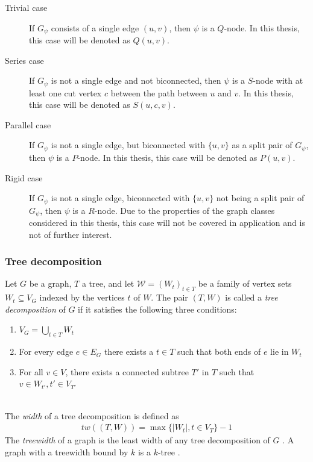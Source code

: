 \begin{description}
	\item[Trivial case] If $G_\psi$ consists of a single edge $(u,v)$, then $\psi$ is a $Q$-node. In this thesis, this case will be denoted as $Q(u,v)$.
	\item[Series case] If $G_\psi$ is not a single edge and not biconnected, then $\psi$ is a $S$-node with at least one cut vertex $c$ between the path between $u$ and $v$. In this thesis, this case will be denoted as $S(u,c,v)$.
	\item[Parallel case] If $G_\psi$ is not a single edge, but biconnected with $\{u,v\}$ as a split pair of $G_\psi$, then $\psi$ is a $P$-node. In this thesis, this case will be denoted as $P(u,v)$.
	\item[Rigid case] If $G_\psi$ is not a single edge, biconnected with $\{u,v\}$ not being a split pair of $G_\psi$, then $\psi$ is a $R$-node. Due to the properties of the graph classes considered in this thesis, this case will not be covered in application and is not of further interest. 
\end{description}
\cite[P. 7-8]{SPQR-Tree}
\subsubsection{Tree decomposition}
Let $G$ be a graph, $T$ a tree, and let $\mathcal{W} = \left(W_t\right)_{t\in T}$ be a family of vertex sets $W_t \subseteq V_G$ indexed by the vertices $t$ of $W$. The pair $(T,W)$ is called a \emph{tree decomposition} of $G$ if it satisfies the following three conditions:
\begin{enumerate}
	\item $V_G = \bigcup_{t\in T}W_t$
	\item For every edge $e\in E_G$ there exists a $t\in T$ such that both ends of $e$ lie in $W_t$
	\item For all $v\in V$, there exists a connected subtree $T'$ in $T$ such that $v \in W_{t'}, t' \in V_{T'}$
\end{enumerate}
\cite[P. 319]{Diestel_GraphTheory}
\\
The \emph{width} of a tree decomposition is defined as 
\begin{align}
	tw((T,W)) = \max\{ |W_t|,t\in V_T \} -1
\end{align}
The \emph{treewidth} of a graph is the least width of any tree decomposition of $G$ \cite[P. 321]{Diestel_GraphTheory}. A graph with a treewidth bound by $k$ is a $k$-tree \cite[P. 5]{k-tree_bounded-treewidth}.
